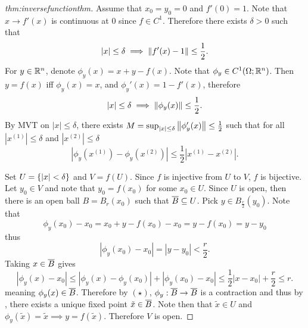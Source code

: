 \documentclass[../main.tex]{subfiles}
\begin{document}
\begin{proof}[thm:inversefunctionthm]
    Assume that $x_0 = y_0 = 0$ and $f'(0) = 1$. Note that $x \to f'(x)$ is continuous at $0$ since $f \in C^1$. Therefore there exists $\delta > 0$ such that
    \[
        |x| \leq \delta \implies \norm{f'(x) - 1} \leq \frac{1}{2}
    .\]
    For $y \in \mathbb{R}^n$, denote $\phi_y(x) = x + y - f(x)$. Note that $\phi_y \in C^1(\Omega; \mathbb{R}^n)$. Then $y = f(x)$ iff $\phi_y(x) = x$, and $\phi_y'(x) = 1 - f'(x)$, therefore
    \[
        |x| \leq \delta \implies \norm{\phi_y(x)} \leq \frac{1}{2}
    .\]
    By MVT on $|x| \leq \delta$, there exists $M = \sup_{|x| \leq \delta} \norm{\phi_y'(x)} \leq \frac{1}{2}$ such that for all $|x^{(1)}| \leq \delta$ and $|x^{(2)}| \leq \delta$
    \[
        |\phi_y(x^{(1)}) - \phi_y(x^{(2)})| \leq \frac{1}{2} |x^{(1)} - x^{(2)}| \tag{\star}
    .\]

    Set $U = \qty{ |x| < \delta }$ and $V = f(U)$. Since $f$ is injective from $U$ to $V$, $f$ is bijective. Let $y_0 \in V$ and note that $y_0 = f(x_0)$ for some $x_0 \in U$. Since $U$ is open, then there is an open ball $B = B_r(x_0)$ such that $\overline{B} \subseteq U$. Pick $y \in B_{\frac{r}{2}}(y_0)$. Note that
    \[
        \phi_y(x_0) - x_0 = x_0 + y - f(x_0) - x_0 = y - f(x_0) = y - y_0
    \]
    thus
    \[
        |\phi_y(x_0) - x_0| = |y - y_0| < \frac{r}{2}
    .\]
    Taking $x \in \overline{B}$ gives 
    \[
        |\phi_y(x) - x_0| \leq |\phi_y(x) - \phi_y(x_0)| + |\phi_y(x_0) - x_0| \leq \frac{1}{2} |x - x_0| + \frac{r}{2} \leq r
    .\]
    meaning $\phi_y(x) \in \overline{B}$. Therefore by $(\star)$, $\phi_y : \overline{B} \to \overline{B}$ is a contraction and thus by , there exists a unique fixed point $\tilde{x} \in \overline{B}$. Note then that $\tilde{x} \in U$ and $\phi_y(\tilde{x}) = \tilde{x} \implies y = f(\tilde{x})$. Therefore $V$ is open.
    

\end{proof}
\end{document}
